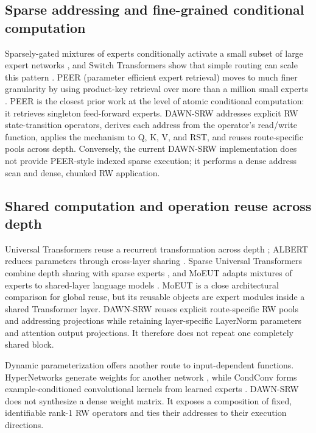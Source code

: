 \documentclass{article}
\newcommand{\DAWN}{DAWN-SRW}
\begin{document}
\subsection{Sparse addressing and fine-grained conditional computation}

Sparsely-gated mixtures of experts conditionally activate a small subset of
large expert networks \cite{shazeer2017outrageously}, and Switch Transformers
show that simple routing can scale this pattern \cite{fedus2022switch}. PEER
(parameter efficient expert retrieval) moves to much finer granularity by
using product-key retrieval over more than a million small experts
\cite{he2024mixture}. PEER is the closest prior work at the level of atomic
conditional computation: it retrieves singleton feed-forward experts.
\DAWN{} addresses explicit RW state-transition operators, derives each address
from the operator's read/write function, applies the mechanism to Q, K, V, and
RST, and reuses route-specific pools across depth. Conversely, the current
\DAWN{} implementation does not provide PEER-style indexed sparse execution;
it performs a dense address scan and dense, chunked RW application.

\subsection{Shared computation and operation reuse across depth}

Universal Transformers reuse a recurrent transformation across depth
\cite{dehghani2019universal}; ALBERT reduces parameters through cross-layer
sharing \cite{lan2020albert}. Sparse Universal Transformers combine depth
sharing with sparse experts \cite{tan2023sparse}, and MoEUT adapts mixtures of
experts to shared-layer language models \cite{csordas2024moeut}. MoEUT is a
close architectural comparison for global reuse, but its reusable objects are
expert modules inside a shared Transformer layer. \DAWN{} reuses explicit
route-specific RW pools and addressing projections while retaining
layer-specific LayerNorm parameters and attention output projections. It
therefore does not repeat one completely shared block.

Dynamic parameterization offers another route to input-dependent functions.
HyperNetworks generate weights for another network
\cite{ha2017hypernetworks}, while CondConv forms example-conditioned
convolutional kernels from learned experts \cite{yang2019condconv}. \DAWN{}
does not synthesize a dense weight matrix. It exposes a composition of fixed,
identifiable rank-1 RW operators and ties their addresses to their execution
directions.
\end{document}
